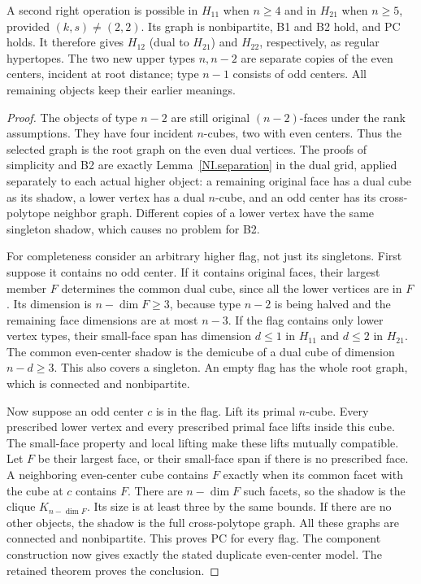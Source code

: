 \begin{proposition}\label{NI.oppositesecond}
A second right operation is possible in $H_{11}$ when $n\ge4$
and in $H_{21}$ when $n\ge5$, provided $(k,s)\ne(2,2)$.
Its graph is nonbipartite, B1 and B2 hold, and PC holds. It
therefore gives $H_{12}$ (dual to $H_{21}$) and $H_{22}$,
respectively, as regular hypertopes.
The two new upper types $n,n-2$ are separate copies of the even
centers, incident at root distance; type $n-1$ consists of odd
centers. All remaining objects keep their earlier meanings.
\end{proposition}
\begin{proof}
The objects of type $n-2$ are still original $(n-2)$-faces under
the rank assumptions. They have four incident $n$-cubes, two
with even centers. Thus the selected graph is the root graph
on the even dual vertices. The proofs of simplicity and B2
are exactly Lemma~\ref{NI.separation} in the dual grid, applied
separately to each actual higher object: a remaining original
face has a dual cube as its shadow, a lower vertex has a dual
$n$-cube, and an odd center has its cross-polytope neighbor graph.
Different copies of a lower vertex have the same singleton shadow,
which causes no problem for B2.

For completeness consider an arbitrary higher flag, not just its
singletons. First suppose it contains no odd center. If it contains
original faces, their largest member $F$ determines the common
dual cube, since all the lower vertices are in $F$. Its dimension
is $n-\dim F\ge3$, because type $n-2$ is being halved and
the remaining face dimensions are at most $n-3$.
If the flag contains only lower vertex types, their small-face
span has dimension $d\le1$ in $H_{11}$ and $d\le2$ in $H_{21}$.
The common even-center shadow is the demicube of a dual cube
of dimension $n-d\ge3$. This also covers a singleton. An empty
flag has the whole root graph, which is connected and nonbipartite.

Now suppose an odd center $c$ is in the flag. Lift its primal
$n$-cube. Every prescribed lower vertex and every prescribed
primal face lifts inside this cube. The small-face property and
local lifting make these lifts mutually compatible. Let $F$ be
their largest face, or their small-face span if there is no
prescribed face. A neighboring even-center cube contains $F$
exactly when its common facet with the cube at $c$ contains $F$.
There are $n-\dim F$ such facets, so the shadow is the clique
$K_{n-\dim F}$. Its size is at least three by the same bounds.
If there are no other objects, the shadow is the full
cross-polytope graph. All these graphs are connected and
nonbipartite. This proves PC for every flag. The component
construction now gives exactly the stated duplicate even-center
model. The retained theorem proves the conclusion.
\end{proof}

